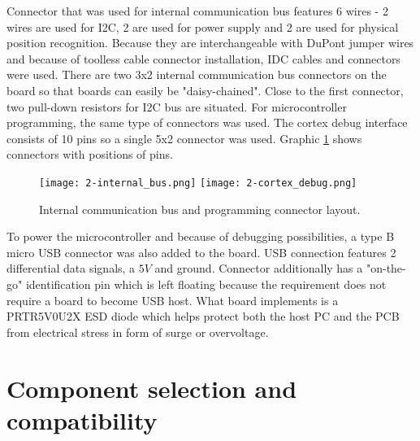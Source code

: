 Connector that was used for internal communication bus features 6 wires - 2 wires are used for \ac{I2C}, 2 are used for power supply and 2 are used for physical position recognition. Because they are interchangeable with DuPont jumper wires and because of toolless cable connector installation, \ac{IDC} cables and connectors were used\cite{IDC}. There are two 3x2 internal communication bus connectors on the board so that boards can easily be "daisy-chained". Close to the first connector, two pull-down resistors for I2C bus are situated. For microcontroller programming, the same type of connectors was used. The cortex debug interface consists of 10 pins so a single 5x2 connector was used. Graphic \ref{fig:connectors} shows connectors with positions of pins.

\begin{figure}[h]
  \begin{center}
    \texttt{[image: 2-internal\_bus.png]}
    \hspace{1cm}
    \texttt{[image: 2-cortex\_debug.png]}
  \end{center}
  \caption{Internal communication bus and programming connector layout.}
  \label{fig:connectors}
\end{figure}


To power the microcontroller and because of debugging possibilities, a type B micro \ac{USB} connector was also added to the board. \ac{USB} connection features 2 differential data signals, a $5V$ and ground. Connector additionally has a "on-the-go" identification pin which is left floating because the requirement does not require a board to become \ac{USB} host. What board implements is a PRTR5V0U2X \ac{ESD} diode\cite{PRTR} which helps protect both the host \ac{PC} and the \ac{PCB} from electrical stress in form of surge or overvoltage.


\section{Component selection and compatibility}

